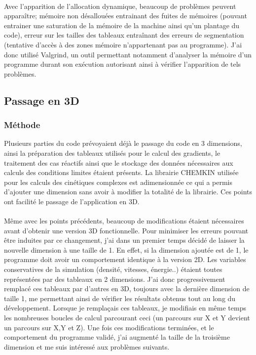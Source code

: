\paragraph{}Avec l'apparition de l'allocation dynamique, beaucoup de problèmes peuvent apparaître; mémoire non désallouées entrainant des fuites de mémoires (pouvant entrainer une saturation de la mémoire de la machine ainsi qu'un plantage du code), erreur sur les tailles des tableaux entraînant des erreurs de segmentation (tentative d'accès à des zones mémoire n'appartenant pas au programme).
J'ai donc utilisé Valgrind, un outil permettant notamment d'analyser la mémoire d'un programme durant son exécution autorisant ainsi à vérifier l'apparition de tels problèmes.




\subsection{Passage en 3D}

\subsubsection{Méthode}\label{sec:3dmeth}
Plusieurs parties du code prévoyaient déjà le passage du code en 3 dimensions, ainsi la préparation des tableaux utilisés pour le calcul des gradients, le traitement des cas réactifs ainsi que le stockage des données nécessaires aux calculs des conditions limites étaient présents. La librairie CHEMKIN utilisée pour les calculs des cinétiques complexes est adimensionnée ce qui a permis d'ajouter une dimension sans avoir à modifier la totalité de la librairie. Ces points ont facilité le passage de l'application en 3D.


\paragraph{}Même avec les points précédents, beaucoup de modifications étaient nécessaires avant d'obtenir une version 3D fonctionnelle. Pour minimiser les erreurs pouvant être induites par ce changement, j'ai dans un premier temps décidé de laisser la nouvelle dimension à une taille de 1. En effet, si la dimension ajoutée est de 1, le programme doit avoir un comportement identique à la version 2D. Les variables conservatives de la simulation (densité, vitesses, énergie..) étaient toutes représentées par des tableaux en 2 dimensions. J'ai donc progressivement remplacé ces tableaux par d'autres en 3D, toujours avec la dernière dimension de taille 1,  me permettant ainsi de vérifier les résultats obtenus tout au long du développement. Lorsque je remplaçais ces tableaux, je modifiais en même temps les nombreuses boucles de calcul parcourant ceci (un parcours sur X et Y devient un parcours sur X,Y et Z). Une fois ces modifications terminées, et le comportement du programme validé, j'ai augmenté la taille de la troisième dimension et me suis intéressé aux problèmes suivants.


